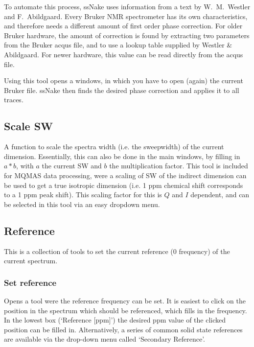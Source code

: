 \documentclass[11pt,a4paper]{article}
\begin{document}

To automate this process, ssNake uses information from a text by W.\ M.\ Westler and F.\ Abildgaard. Every Bruker NMR spectrometer has its own characteristics, and therefore needs a different amount of first order phase correction. For older Bruker hardware, the amount of correction is found by extracting two parameters from the Bruker acqus file, and to use a lookup table supplied by Westler \& Abildgaard. For newer hardware, this value can be read directly from the acqus file.

Using this tool opens a windows, in which you have to open (again) the current Bruker file. ssNake then finds the desired phase correction and applies it to all traces.

\subsection{Scale SW}
A function to scale the spectra width (i.e. the sweepwidth) of the current dimension. Essentially,
this can also be done in the main windows, by filling in $a * b$, with $a$ the current SW and $b$
the multiplication factor. This tool is included for MQMAS data processing, were a scaling of SW of the
indirect dimension can be used to get a true isotropic dimension (i.e. 1 ppm chemical shift
corresponds to a 1 ppm peak shift). This scaling factor for this is $Q$ and $I$ dependent, and can be selected in
this tool via an easy dropdown menu.

\subsection{Reference}
This is a collection of tools to set the current reference (0 frequency) of the current spectrum.

\subsubsection{Set reference}
Opens a tool were the reference frequency can be set. It is easiest to click on the position in the spectrum
which should be referenced, which fills in the frequency. In the lowest box (`Reference [ppm]') the desired
ppm value of the clicked position can be filled in. Alternatively, a series of common solid state references
are available via the drop-down menu called `Secondary Reference'.
\end{document}
